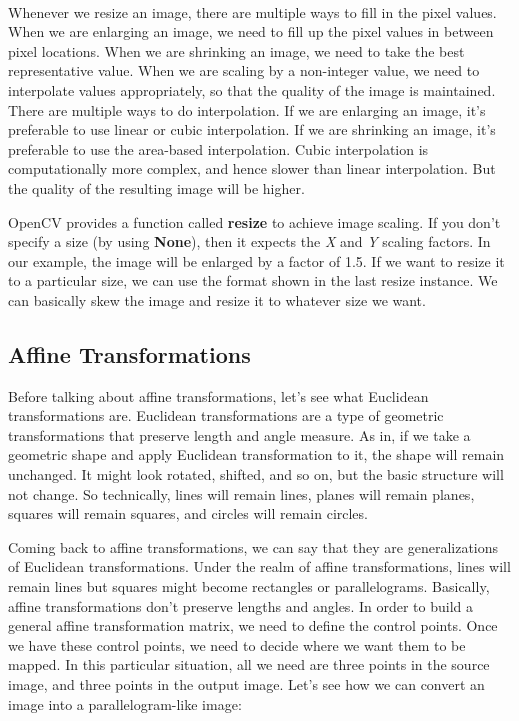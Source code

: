 \newpage

\begin{center}
\end{center}
{ \hspace*{\fill} \\}

Whenever we resize an image, there are multiple ways to fill in the pixel values. When we are enlarging an 	image, we need to fill up the pixel values in between pixel locations. When we are shrinking an image, we need to take 	the best representative value. When we are scaling by a non-integer value, we need to interpolate values 	appropriately, so that the quality of the image is maintained. There are multiple ways to do interpolation. If we are 	enlarging an image, it's preferable to use linear or cubic interpolation. If we are shrinking an image, it's preferable to 	use the area-based interpolation. Cubic interpolation is computationally more complex, and hence slower than linear 	interpolation. But the quality of the resulting image will be higher.

OpenCV provides a function called \textbf{resize} to achieve image scaling. If you don't specify a size (by using \textbf{None}), 	then it expects the \textit{X} and \textit{Y} scaling factors. In our example, the image will be enlarged by a factor of 1.5. If we want to 	resize it to a particular size, we can use the format shown in the last resize instance. We can basically skew the image 	and resize it to whatever size we want.

\subsection{Affine Transformations}
Before talking about affine transformations, let's see what Euclidean transformations are. Euclidean 	transformations are a type of geometric transformations that preserve length and angle measure. As in, if we take a 	geometric shape and apply Euclidean transformation to it, the shape will remain unchanged. It might look rotated, 	shifted, and so on, but the basic structure will not change. So technically, lines will remain lines, planes will remain 	planes, squares will remain squares, and circles will remain circles.

Coming back to affine transformations, we can say that they are generalizations of Euclidean transformations. 	Under the realm of affine transformations, lines will remain lines but squares might become rectangles or 	parallelograms. Basically, affine transformations don't preserve lengths and angles. In order to build a general affine 	transformation matrix, we need to define the control points. Once we have these control points, we need to decide 	where we want them to be mapped. In this particular situation, all we need are three points in the source image, and 	three points in the output image. Let's see how we can convert an image into a parallelogram-like image:


